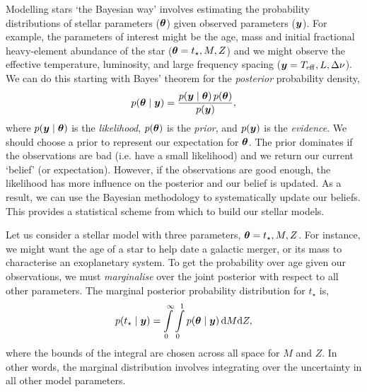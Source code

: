 
Modelling stars `the Bayesian way' involves estimating the probability distributions of stellar parameters (\(\bm{\theta}\)) given observed parameters (\(\bm{y}\)). For example, the parameters of interest might be the age, mass and initial fractional heavy-element abundance of the star (\(\bm{\theta} = t_\star, M, Z\)) and we might observe the effective temperature, luminosity, and large frequency spacing (\(\bm{y} = {T_\mathrm{eff}}, L, \Delta\nu\)). We can do this starting with Bayes' theorem for the \emph{posterior} probability density,
%
\begin{equation}
    p(\bm{\theta} \mid \bm{y}) = \frac{p(\bm{y} \mid \bm{\theta})\,p(\bm{\theta})}{p(\bm{y})},
\end{equation}
%
where \(p(\bm{y} \mid \bm{\theta})\) is the \emph{likelihood}, \(p(\bm{\theta})\) is the \emph{prior}, and \(p(\bm{y})\) is the \emph{evidence}. We should choose a prior to represent our expectation for \(\bm{\theta}\). The prior dominates if the observations are bad (i.e. have a small likelihood) and we return our current `belief' (or expectation). However, if the observations are good enough, the likelihood has more influence on the posterior and our belief is updated. As a result, we can use the Bayesian methodology to systematically update our beliefs. This provides a statistical scheme from which to build our stellar models.

Let us consider a stellar model with three parameters, \(\bm{\theta} = t_\star, M, Z\). For instance, we might want the age of a star to help date a galactic merger, or its mass to characterise an exoplanetary system. To get the probability over age given our observations, we must \emph{marginalise} over the joint posterior with respect to all other parameters. The marginal posterior probability distribution for \(t_\star\) is,
%
\begin{equation}
    p(t_\star \mid \bm{y}) = \int\limits_0^\infty \int\limits_0^1 p(\bm{\theta} \mid \bm{y}) \, \mathrm{d} M \mathrm{d} Z,
\end{equation}
%
where the bounds of the integral are chosen across all space for \(M\) and \(Z\). In other words, the marginal distribution involves integrating over the uncertainty in all other model parameters.

